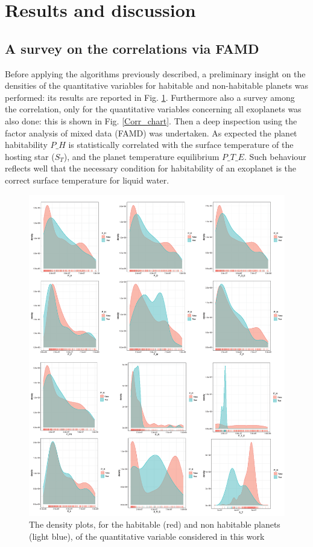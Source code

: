 \documentclass[
12pt, %
a4paper, %
oneside, %
headinclude,footinclude, %
BCOR5mm, %
]{scrartcl}
\begin{document}
\section{Results and discussion}


\subsection{A survey on the correlations via FAMD}

Before applying the algorithms previously described, a preliminary insight on the densities of the quantitative variables for habitable and non-habitable planets was performed: its results are reported in Fig. \ref{Desities}. Furthermore also a survey among the correlation, only for the quantitative variables concerning all exoplanets was also done: this is shown in Fig. \ref{Corr_chart}. Then a deep inspection using the factor analysis of mixed data (FAMD) was undertaken.  As expected the planet habitability $P\_H$ is statistically correlated with the surface temperature of the hosting star ($S_T$), and the planet temperature equilibrium $P\_T\_E$. Such behaviour reflects well that the necessary condition for habitability of an exoplanet is the correct surface temperature for  liquid water. 


\begin{figure}[h]
\begin{center}
\includegraphics[width=1\textwidth]{Pic/Merge.png}
\caption{The density plots, for the habitable (red) and non habitable planets (light blue), of the quantitative variable considered in this work}
\label{Desities}
\end{center}
\end{figure}
\end{document}
